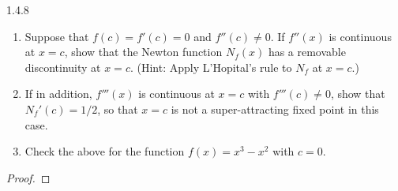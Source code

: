 \begin{problem}{1.4.8}
  \begin{enumerate}
    \item Suppose that $f(c) = f'(c) = 0$ and $f''(c) \neq 0$. If $f''(x)$ is continuous at $x = c$,
      show that the Newton function $N_f (x)$ has a removable discontinuity at $x = c$. (Hint:
      Apply L’Hopital’s rule to $N_f$ at $x = c$.)
    \item If in addition, $f'''(x)$ is continuous at $x = c$ with $f'''(c) \neq 0$,
      show that $N_f'(c) = 1/2$, so that $x = c$ is not a super-attracting fixed point in this case.
    \item Check the above for the function $f(x) = x^3 − x^2$ with $c = 0$.
  \end{enumerate}
\end{problem}

\begin{proof}
\end{proof}
\newpage
